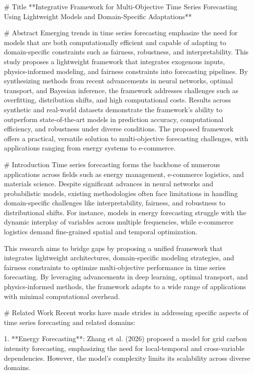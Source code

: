 # Title
**Integrative Framework for Multi-Objective Time Series Forecasting Using Lightweight Models and Domain-Specific Adaptations**

# Abstract
Emerging trends in time series forecasting emphasize the need for models that are both computationally efficient and capable of adapting to domain-specific constraints such as fairness, robustness, and interpretability. This study proposes a lightweight framework that integrates exogenous inputs, physics-informed modeling, and fairness constraints into forecasting pipelines. By synthesizing methods from recent advancements in neural networks, optimal transport, and Bayesian inference, the framework addresses challenges such as overfitting, distribution shifts, and high computational costs. Results across synthetic and real-world datasets demonstrate the framework's ability to outperform state-of-the-art models in prediction accuracy, computational efficiency, and robustness under diverse conditions. The proposed framework offers a practical, versatile solution to multi-objective forecasting challenges, with applications ranging from energy systems to e-commerce.

# Introduction
Time series forecasting forms the backbone of numerous applications across fields such as energy management, e-commerce logistics, and materials science. Despite significant advances in neural networks and probabilistic models, existing methodologies often face limitations in handling domain-specific challenges like interpretability, fairness, and robustness to distributional shifts. For instance, models in energy forecasting struggle with the dynamic interplay of variables across multiple frequencies, while e-commerce logistics demand fine-grained spatial and temporal optimization. 

This research aims to bridge gaps by proposing a unified framework that integrates lightweight architectures, domain-specific modeling strategies, and fairness constraints to optimize multi-objective performance in time series forecasting. By leveraging advancements in deep learning, optimal transport, and physics-informed methods, the framework adapts to a wide range of applications with minimal computational overhead.

# Related Work
Recent works have made strides in addressing specific aspects of time series forecasting and related domains:

1. **Energy Forecasting**: Zhang et al. (2026) proposed a model for grid carbon intensity forecasting, emphasizing the need for local-temporal and cross-variable dependencies. However, the model's complexity limits its scalability across diverse domains.
   
